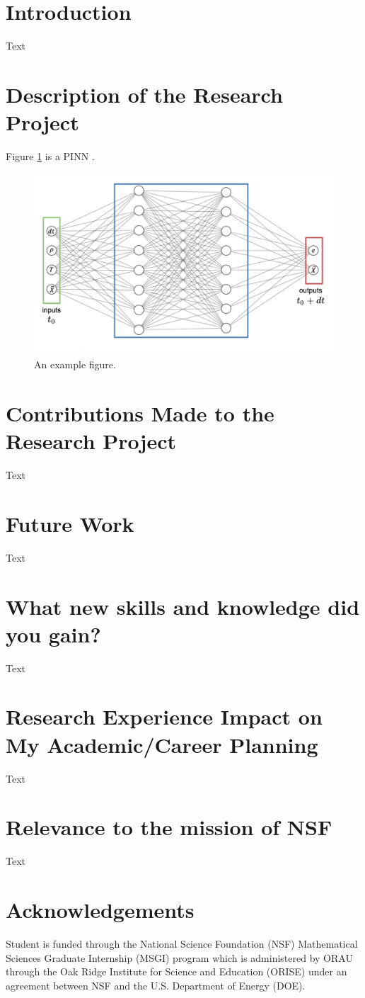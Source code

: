 \documentclass[12pt]{article}
\begin{document}
\newpage
\section*{Introduction}
Text


\section*{Description of the Research Project}
Figure \ref{fig:pinn} is a PINN \cite{RAISSI2019686}.
\begin{figure}[H]
    \centering
    \includegraphics[scale=0.7]{pinn.png}
    \caption{An example figure.}
    \label{fig:pinn}
\end{figure}


\section*{Contributions Made to the Research Project}
Text

\section*{Future Work}
Text

\section*{What new skills and knowledge did you gain?}
Text

\section*{Research Experience Impact on My Academic/Career Planning}
Text

\section*{Relevance to the mission of NSF}
Text

\section*{Acknowledgements}
Student is funded through the National Science Foundation (NSF) Mathematical Sciences Graduate Internship (MSGI) program which is administered by ORAU through the Oak Ridge Institute for Science and Education (ORISE) under an agreement between NSF and the U.S. Department of Energy (DOE). 


\end{document}
